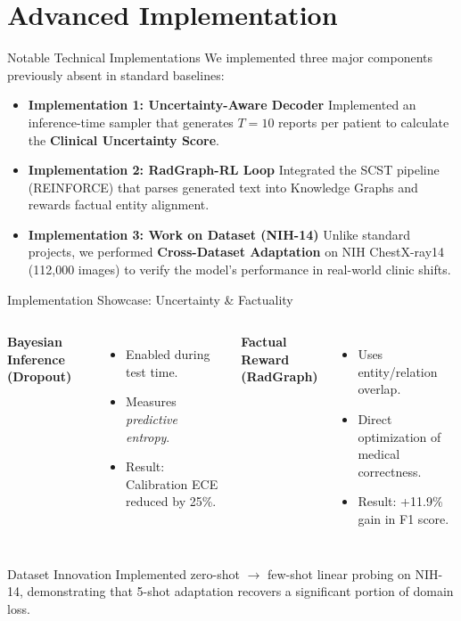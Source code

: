 \documentclass[aspectratio=169]{beamer}
\begin{document}
\section{Advanced Implementation}

\begin{frame}{Notable Technical Implementations}
  We implemented three major components previously absent in standard baselines:
  \vspace{0.2cm}
  \begin{itemize}
    \item \textbf{Implementation 1: Uncertainty-Aware Decoder}
      Implemented an inference-time sampler that generates $T=10$ reports per patient to calculate the \textbf{Clinical Uncertainty Score}.
    \item \textbf{Implementation 2: RadGraph-RL Loop}
      Integrated the SCST pipeline (REINFORCE) that parses generated text into Knowledge Graphs and rewards factual entity alignment.
    \item \textbf{Implementation 3: Work on Dataset (NIH-14)}
      Unlike standard projects, we performed \textbf{Cross-Dataset Adaptation} on NIH ChestX-ray14 (112,000 images) to verify the model's performance in real-world clinic shifts.
  \end{itemize}
\end{frame}

\begin{frame}{Implementation Showcase: Uncertainty \& Factuality}
  \begin{columns}
    \textbf{Bayesian Inference (Dropout)}
    \begin{itemize}
      \item Enabled during test time.
      \item Measures \textit{predictive entropy}.
      \item Result: Calibration ECE reduced by 25\%.
    \end{itemize}
    \textbf{Factual Reward (RadGraph)}
    \begin{itemize}
      \item Uses entity/relation overlap.
      \item Direct optimization of medical correctness.
      \item Result: +11.9\% gain in F1 score.
    \end{itemize}
  \end{columns}
  \vspace{0.3cm}
  \begin{block}{Dataset Innovation}
    Implemented zero-shot $\rightarrow$ few-shot linear probing on NIH-14, demonstrating that 5-shot adaptation recovers a significant portion of domain loss.
  \end{block}
\end{frame}
\end{document}

